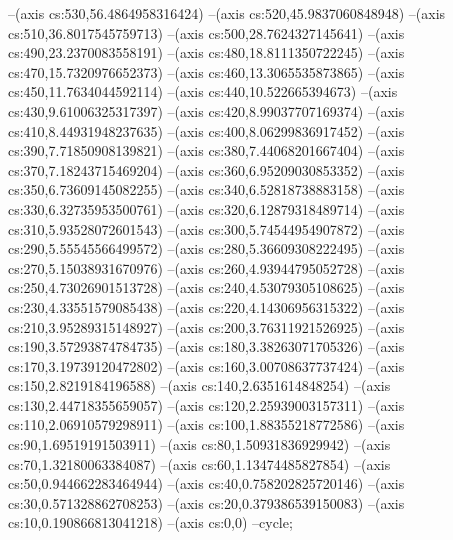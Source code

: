 --(axis cs:530,56.4864958316424)
--(axis cs:520,45.9837060848948)
--(axis cs:510,36.8017545759713)
--(axis cs:500,28.7624327145641)
--(axis cs:490,23.2370083558191)
--(axis cs:480,18.8111350722245)
--(axis cs:470,15.7320976652373)
--(axis cs:460,13.3065535873865)
--(axis cs:450,11.7634044592114)
--(axis cs:440,10.522665394673)
--(axis cs:430,9.61006325317397)
--(axis cs:420,8.99037707169374)
--(axis cs:410,8.44931948237635)
--(axis cs:400,8.06299836917452)
--(axis cs:390,7.71850908139821)
--(axis cs:380,7.44068201667404)
--(axis cs:370,7.18243715469204)
--(axis cs:360,6.95209030853352)
--(axis cs:350,6.73609145082255)
--(axis cs:340,6.52818738883158)
--(axis cs:330,6.32735953500761)
--(axis cs:320,6.12879318489714)
--(axis cs:310,5.93528072601543)
--(axis cs:300,5.74544954907872)
--(axis cs:290,5.55545566499572)
--(axis cs:280,5.36609308222495)
--(axis cs:270,5.15038931670976)
--(axis cs:260,4.93944795052728)
--(axis cs:250,4.73026901513728)
--(axis cs:240,4.53079305108625)
--(axis cs:230,4.33551579085438)
--(axis cs:220,4.14306956315322)
--(axis cs:210,3.95289315148927)
--(axis cs:200,3.76311921526925)
--(axis cs:190,3.57293874784735)
--(axis cs:180,3.38263071705326)
--(axis cs:170,3.19739120472802)
--(axis cs:160,3.00708637737424)
--(axis cs:150,2.8219184196588)
--(axis cs:140,2.6351614848254)
--(axis cs:130,2.44718355659057)
--(axis cs:120,2.25939003157311)
--(axis cs:110,2.06910579298911)
--(axis cs:100,1.88355218772586)
--(axis cs:90,1.69519191503911)
--(axis cs:80,1.50931836929942)
--(axis cs:70,1.32180063384087)
--(axis cs:60,1.13474485827854)
--(axis cs:50,0.944662283464944)
--(axis cs:40,0.758202825720146)
--(axis cs:30,0.571328862708253)
--(axis cs:20,0.379386539150083)
--(axis cs:10,0.190866813041218)
--(axis cs:0,0)
--cycle;

